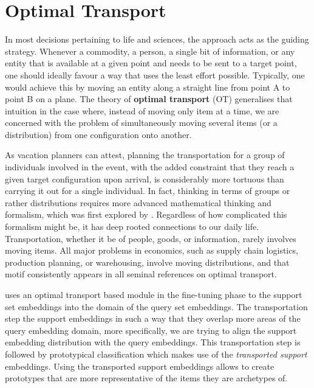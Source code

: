 \newcommand{\mcX}{\mathcal{X}}
\newcommand{\bfitr}{\symbfit{r}}
\newcommand{\bfitc}{\symbfit{c}}

\chapter{Optimal Transport}\label{chap:optimal-transport}

In most decisions pertaining to life and sciences, the  approach acts as the guiding strategy. Whenever a commodity, a person, a single bit of information, or any entity that is available at a given point and needs to be sent to a target point, one should ideally favour a way that uses the least effort possible. Typically, one would achieve this by moving an entity along a straight line from point A to point B on a plane.
The theory of \textbf{optimal transport} (OT) generalises that intuition in the case where, instead of moving only item at a time, we are concerned with the problem of simultaneously moving several items (or a distribution) from one configuration onto another.

As vacation planners can attest, planning the transportation for a group of individuals involved in the event, with the added constraint that they reach a given target configuration upon arrival, is considerably more tortuous than carrying it out for a single individual. In fact, thinking in terms of groups or rather distributions requires more advanced mathematical thinking and formalism, which was first explored by \textcite{monge1781memoire}. Regardless of how complicated this formalism might be, it has deep rooted connections to our daily life. 
Transportation, whether it be of people, goods, or information, rarely involves moving items. All major problems in economics, such as supply chain logistics, production planning, or warehousing, involve moving distributions, and that motif consistently appears in all seminal references on optimal transport.

\samptr{} uses an optimal transport based module in the fine-tuning phase to  the support set embeddings into the domain of the query set embeddings. 
The transportation step  the support embeddings in such a way that they overlap more areas of the query embedding domain, more specifically, we are trying to align the support embedding distribution with the query embeddings.
This transportation step is followed by prototypical classification which makes use of the \textit{transported support} embeddings. Using the transported support embeddings allows to create prototypes that are more representative of the items they are archetypes of.

